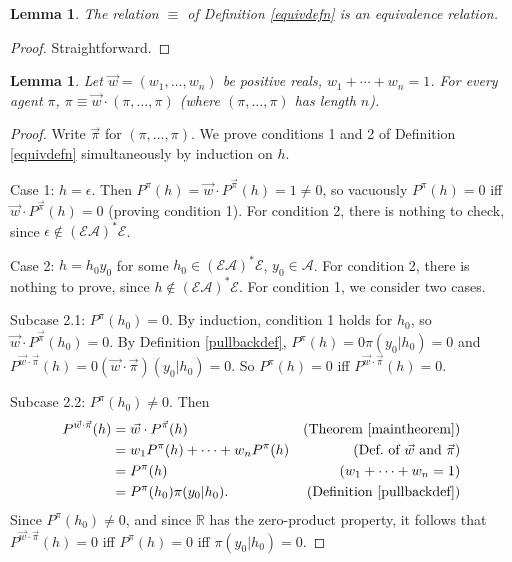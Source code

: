\documentclass[twoside]{article}
\newtheorem{lemma}[theorem]{Lemma}
\begin{document}
\begin{lemma}
\label{equivrelationlemma}
    The relation $\equiv$ of Definition \ref{equivdefn} is an equivalence
    relation.
\end{lemma}

\begin{proof}
    Straightforward.
\end{proof}

\begin{lemma}
\label{piopluspilemma}
    Let $\vec w=(w_1,\ldots,w_n)$ be positive reals,
    $w_1+\cdots+w_n=1$. For every agent $\pi$,
    $\pi\equiv\vec w\cdot (\pi,\ldots,\pi)$ (where
    $(\pi,\ldots,\pi)$ has length $n$).
\end{lemma}

\begin{proof}
    Write $\vec\pi$ for $(\pi,\ldots,\pi)$.
    We prove conditions 1 and 2 of Definition \ref{equivdefn}
    simultaneously by induction on $h$.
 
    Case 1: $h=\epsilon$. Then
    $P^\pi(h)=\vec w\cdot{P^{\vec\pi}}(h)=1\not=0$, so
    vacuously $P^\pi(h)=0$ iff $\vec w\cdot{P^{\vec\pi}}(h)=0$
    (proving condition 1).
    For condition 2, there is nothing to check, since
    $\epsilon\not\in(\mathcal E\mathcal A)^*\mathcal E$.

    Case 2: $h=h_0y_0$ for some
        $h_0\in(\mathcal E\mathcal A)^*\mathcal E$, $y_0\in\mathcal A$.
        For condition 2, there is nothing to prove, since
        $h\not\in(\mathcal E\mathcal A)^*\mathcal E$.
        For condition 1, we consider two cases.

        Subcase 2.1: $P^\pi(h_0)=0$.
        By induction, condition 1 holds for $h_0$, so
        $\vec w\cdot{P^{\vec\pi}}(h_0)=0$.
        By Definition \ref{pullbackdef},
        $P^\pi(h)=0\pi(y_0|h_0)=0$
        and $P^{\vec w\cdot\vec\pi}(h)=0(\vec w\cdot\vec\pi)(y_0|h_0)=0$.
        So $P^\pi(h)=0$ iff $P^{\vec w\cdot\vec\pi}(h)=0$.

        Subcase 2.2: $P^\pi(h_0)\not=0$.
        Then
        \begin{align*}
            P^{\vec w\cdot \vec\pi}(h)
                &= \vec w\cdot{P^{\vec\pi}}(h)
                    &\mbox{(Theorem \ref{maintheorem})}\\
                &= w_1 P^\pi(h)+\cdots+w_n P^\pi(h)
                    &\mbox{(Def.\ of $\vec w$ and $\vec\pi$)}\\
                &= P^\pi(h)
                    &\mbox{($w_1+\cdots+w_n=1$)}\\
                &= P^\pi(h_0)\pi(y_0|h_0).
                    &\mbox{(Definition \ref{pullbackdef})}
        \end{align*}
        Since $P^\pi(h_0)\not=0$, and since $\mathbb R$ has the zero-product property,
        it follows that
        $P^{\vec w\cdot\vec\pi}(h)=0$ iff $P^\pi(h)=0$ iff $\pi(y_0|h_0)=0$.


\end{proof}
\end{document}
